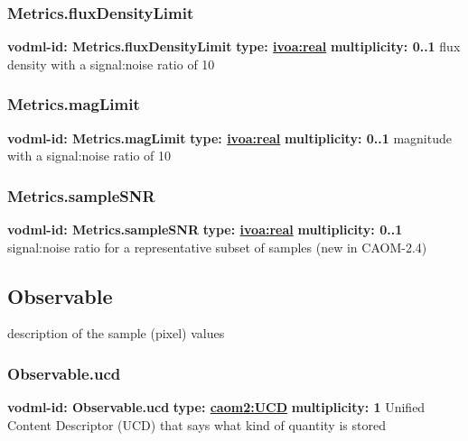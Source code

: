     \subsubsection{Metrics.fluxDensityLimit}
      \textbf{vodml-id: Metrics.fluxDensityLimit} \newline
      \textbf{type: \hyperref[sect:ivoa]{ivoa:real}} \newline
      \textbf{multiplicity: 0..1} \newline
      flux density with a signal:noise ratio of 10

    \subsubsection{Metrics.magLimit}
      \textbf{vodml-id: Metrics.magLimit} \newline
      \textbf{type: \hyperref[sect:ivoa]{ivoa:real}} \newline
      \textbf{multiplicity: 0..1} \newline
      magnitude with a signal:noise ratio of 10

    \subsubsection{Metrics.sampleSNR}
      \textbf{vodml-id: Metrics.sampleSNR} \newline
      \textbf{type: \hyperref[sect:ivoa]{ivoa:real}} \newline
      \textbf{multiplicity: 0..1} \newline
      signal:noise ratio for a representative subset of samples (new in CAOM-2.4)

  \subsection{Observable}
  \label{sect:Observable}
    description of the sample (pixel) values

    \subsubsection{Observable.ucd}
      \textbf{vodml-id: Observable.ucd} \newline
      \textbf{type: \hyperref[sect:UCD]{caom2:UCD}} \newline
      \textbf{multiplicity: 1} \newline
      Unified Content Descriptor (UCD) that says what kind of quantity is stored


